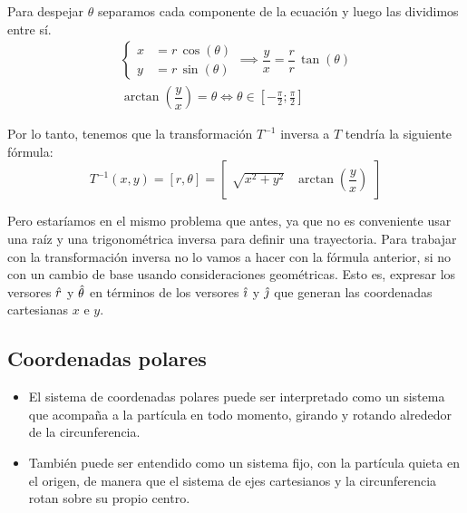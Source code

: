 \documentclass[a5paper,12pt,twoside]{book}
\begin{document}
Para despejar $\theta$ separamos cada componente de la ecuación y luego las dividimos entre sí.
\begin{gather*}
  \left\{
    \begin{aligned}
      x &= r \, \cos{(\theta)}
      \\
      y &= r \, \sin{(\theta)}
    \end{aligned}
  \right.
  \implies
  \dfrac{y}{x} = \dfrac{r}{r} \, \tan{(\theta)}
  \\
  \arctan{\left( \dfrac{y}{x} \right)} = \theta \iff \theta \in \left[ -\tfrac{\pi}{2};\tfrac{\pi}{2} \right]
\end{gather*}

Por lo tanto, tenemos que la transformación $T^{-1}$ inversa a $T$ tendría la siguiente fórmula:
\[
  T^{-1} (x,y) = [r,\theta] =
  \begin{bmatrix}
      \sqrt{x^2 + y^2} & \arctan{\left( \dfrac{y}{x} \right)} 
  \end{bmatrix}
\]

Pero estaríamos en el mismo problema que antes, ya que no es conveniente usar una raíz y una trigonométrica inversa para definir una trayectoria. Para trabajar con la transformación inversa no lo vamos a hacer con la fórmula anterior, si no con un cambio de base usando consideraciones geométricas. Esto es, expresar los versores $\hat{r}$ y $\hat{\theta}$ en términos de los versores $\hat{\imath}$ y $\hat{\jmath}$ que generan las coordenadas cartesianas $x$ e $y$.

\subsection{Coordenadas polares}
\label{A:polarCoordinates}

\begin{center}
    \def\svgwidth{0.7\linewidth}
    
\end{center}

\begin{itemize}
  \item El sistema de coordenadas polares puede ser interpretado como un sistema que acompaña a la partícula en todo momento, girando y rotando alrededor de la circunferencia.
  \item También puede ser entendido como un sistema fijo, con la partícula quieta en el origen, de manera que el sistema de ejes cartesianos y la circunferencia rotan sobre su propio centro.
\end{itemize}
\end{document}
